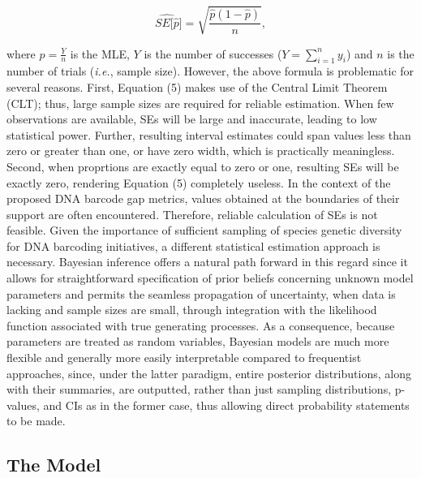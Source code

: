 \documentclass[12pt]{article}
\begin{document}
\begin{equation}
\widehat{SE[\hat{p}}] = \sqrt{\frac{\hat{p}(1 - \hat{p})}{n}},
\end{equation}

\noindent where $\hat{p} = \frac{Y}{n}$ is the MLE, $Y$ is the number of successes ($Y = \sum_{i=1}^n{y_i}$) and $n$ is the number of trials (\textit{i.e.}, sample size). However, the above formula is problematic for several reasons. First, Equation (5) makes use of the Central Limit Theorem (CLT); thus, large sample sizes are required for reliable estimation. When few observations are available, SEs will be large and inaccurate, leading to low statistical power. Further, resulting interval estimates could span values less than zero or greater than one, or have zero width, which is practically meaningless. Second, when proprtions are exactly equal to zero or one, resulting SEs will be exactly zero, rendering Equation (5) completely useless. In the context of the proposed DNA barcode gap metrics, values obtained at the boundaries of their support are often encountered. Therefore, reliable calculation of SEs is not feasible. Given the importance of sufficient sampling of species genetic diversity for DNA barcoding initiatives, a different statistical estimation approach is necessary. Bayesian inference offers a natural path forward in this regard since it allows for straightforward specification of prior beliefs concerning unknown model parameters and permits the seamless propagation of uncertainty, when data is lacking and sample sizes are small, through integration with the likelihood function associated with true generating processes. As a consequence, because parameters are treated as random variables, Bayesian models are much more flexible and generally more easily interpretable compared to frequentist approaches, since, under the latter paradigm, entire posterior distributions, along with their summaries, are outputted, rather than just sampling distributions, p-values, and CIs as in the former case, thus allowing direct probability statements to be made. 

\subsection{The Model}
\end{document}
